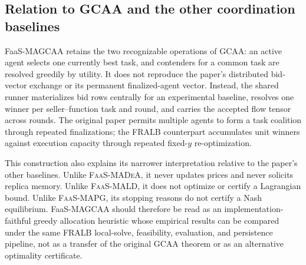 \subsection{Relation to GCAA and the other coordination baselines}
\label{sec:magcaa-positioning}

FaaS-MAGCAA retains the two recognizable operations of GCAA: an active agent
selects one currently best task, and contenders for a common task are
resolved greedily by utility. It does not reproduce the paper's distributed
bid-vector exchange or its permanent finalized-agent vector. Instead, the
shared runner materializes bid rows centrally for an experimental baseline,
resolves one winner per seller--function task and round, and carries the
accepted flow tensor across rounds. The original paper permits multiple
agents to form a task coalition through repeated finalizations; the FRALB
counterpart accumulates unit winners against execution capacity through
repeated fixed-$y$ re-optimization.

This construction also explains its narrower interpretation relative to
the paper's other baselines. Unlike \textsc{FaaS-MADeA}, it never updates
prices and never solicits replica memory. Unlike \textsc{FaaS-MALD}, it does
not optimize or certify a Lagrangian bound. Unlike \textsc{FaaS-MAPG}, its
stopping reasons do not certify a Nash equilibrium. FaaS-MAGCAA should
therefore be read as an implementation-faithful greedy allocation heuristic
whose empirical results can be compared under the same FRALB local-solve,
feasibility, evaluation, and persistence pipeline, not as a transfer of the
original GCAA theorem or as an alternative optimality certificate.
